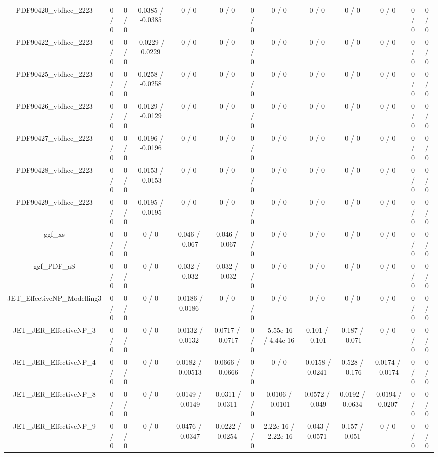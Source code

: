 \documentclass[10pt]{article}
\begin{document}
\begin{table}[htbp]
\begin{center}
\begin{tabular}{|c|c|c|c|c|c|c|c|c|c|c|c|c|}
  PDF90420_vbfhcc_2223 & 0 / 0 & 0 / 0 & 0.0385 / -0.0385 & 0 / 0 & 0 / 0 & 0 / 0 & 0 / 0 & 0 / 0 & 0 / 0 & 0 / 0 & 0 / 0 & 0 / 0 \\ 
  PDF90422_vbfhcc_2223 & 0 / 0 & 0 / 0 & -0.0229 / 0.0229 & 0 / 0 & 0 / 0 & 0 / 0 & 0 / 0 & 0 / 0 & 0 / 0 & 0 / 0 & 0 / 0 & 0 / 0 \\ 
  PDF90425_vbfhcc_2223 & 0 / 0 & 0 / 0 & 0.0258 / -0.0258 & 0 / 0 & 0 / 0 & 0 / 0 & 0 / 0 & 0 / 0 & 0 / 0 & 0 / 0 & 0 / 0 & 0 / 0 \\ 
  PDF90426_vbfhcc_2223 & 0 / 0 & 0 / 0 & 0.0129 / -0.0129 & 0 / 0 & 0 / 0 & 0 / 0 & 0 / 0 & 0 / 0 & 0 / 0 & 0 / 0 & 0 / 0 & 0 / 0 \\ 
  PDF90427_vbfhcc_2223 & 0 / 0 & 0 / 0 & 0.0196 / -0.0196 & 0 / 0 & 0 / 0 & 0 / 0 & 0 / 0 & 0 / 0 & 0 / 0 & 0 / 0 & 0 / 0 & 0 / 0 \\ 
  PDF90428_vbfhcc_2223 & 0 / 0 & 0 / 0 & 0.0153 / -0.0153 & 0 / 0 & 0 / 0 & 0 / 0 & 0 / 0 & 0 / 0 & 0 / 0 & 0 / 0 & 0 / 0 & 0 / 0 \\ 
  PDF90429_vbfhcc_2223 & 0 / 0 & 0 / 0 & 0.0195 / -0.0195 & 0 / 0 & 0 / 0 & 0 / 0 & 0 / 0 & 0 / 0 & 0 / 0 & 0 / 0 & 0 / 0 & 0 / 0 \\ 
  ggf_xs & 0 / 0 & 0 / 0 & 0 / 0 & 0.046 / -0.067 & 0.046 / -0.067 & 0 / 0 & 0 / 0 & 0 / 0 & 0 / 0 & 0 / 0 & 0 / 0 & 0 / 0 \\ 
  ggf_PDF_aS & 0 / 0 & 0 / 0 & 0 / 0 & 0.032 / -0.032 & 0.032 / -0.032 & 0 / 0 & 0 / 0 & 0 / 0 & 0 / 0 & 0 / 0 & 0 / 0 & 0 / 0 \\ 
  JET_EffectiveNP_Modelling3 & 0 / 0 & 0 / 0 & 0 / 0 & -0.0186 / 0.0186 & 0 / 0 & 0 / 0 & 0 / 0 & 0 / 0 & 0 / 0 & 0 / 0 & 0 / 0 & 0 / 0 \\ 
  JET_JER_EffectiveNP_3 & 0 / 0 & 0 / 0 & 0 / 0 & -0.0132 / 0.0132 & 0.0717 / -0.0717 & 0 / 0 & -5.55e-16 / 4.44e-16 & 0.101 / -0.101 & 0.187 / -0.071 & 0 / 0 & 0 / 0 & 0 / 0 \\ 
  JET_JER_EffectiveNP_4 & 0 / 0 & 0 / 0 & 0 / 0 & 0.0182 / -0.00513 & 0.0666 / -0.0666 & 0 / 0 & 0 / 0 & -0.0158 / 0.0241 & 0.528 / -0.176 & 0.0174 / -0.0174 & 0 / 0 & 0 / 0 \\ 
  JET_JER_EffectiveNP_8 & 0 / 0 & 0 / 0 & 0 / 0 & 0.0149 / -0.0149 & -0.0311 / 0.0311 & 0 / 0 & 0.0106 / -0.0101 & 0.0572 / -0.049 & 0.0192 / 0.0634 & -0.0194 / 0.0207 & 0 / 0 & 0 / 0 \\ 
  JET_JER_EffectiveNP_9 & 0 / 0 & 0 / 0 & 0 / 0 & 0.0476 / -0.0347 & -0.0222 / 0.0254 & 0 / 0 & 2.22e-16 / -2.22e-16 & -0.043 / 0.0571 & 0.157 / 0.051 & 0 / 0 & 0 / 0 & 0 / 0 \\ 

\end{tabular}
\end{center}
\end{table}
\end{document}
